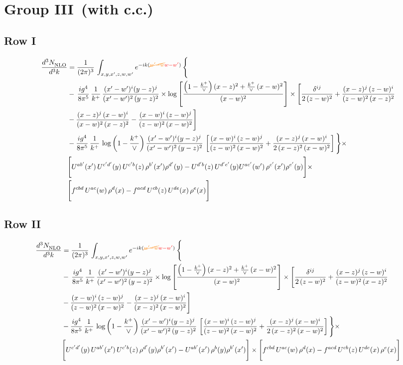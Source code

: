 \documentclass[9pt]{article}
\numberwithin{equation}{section}
\begin{document}
\section{Group III\, (with c.c.)}
\subsection{Row I}
\begin{align}
     \frac{d^{3}N_{\rm NLO}^{\rm}}{d^{3}k}  & =   \frac{1}{(2\pi)^{3}}\, \int_{x,y,x',z,w,w^{\prime}} e^{-ik({\color{orange}\cancel{w^{\prime}-w}}{\color{red}w-w^{\prime}})}\, \Bigg\{\notag \\
& -\,\frac{ig^{4}}{8\pi^{5}}\,\frac{1}{k^{+}}\,\frac{(x'-w')^{i}(y-z)^{j}}{(x'-w')^{2}\,(y-z)^{2}}\times \log{\left[\frac{\left(1-\frac{k^{+}}{\vee}\right)(x-z)^{2}+\frac{k^{+}}{\vee}\,(x-w)^{2}}{(x-w)^{2}}\right]}\times \Bigg[\frac{\delta^{ij}}{2\,(z-w)^{2}}+\frac{(x-z)^{j}\,(z-w)^{i}}{(z-w)^{2}\,(x-z)^{2}}\notag \\ & -\frac{(x-z)^{j}\,(x-w)^{i}}{(x-w)^{2}\,(x-z)^{2}}-\frac{(x-w)^{i}\,(z-w)^{j}}{(z-w)^{2}\,(x-w)^{2}}\Bigg] \notag \\
& -\frac{ig^{4}}{8\pi^{5}}\,\frac{1}{k^{+}}\,\log{\left(1-\frac{k^{+}}{\vee}\right)}\,\frac{(x'-w')^{i}(y-z)^{j}}{(x'-w')^{2}\,(y-z)^{2}}\,\left[\frac{(x-w)^{i}\,(z-w)^{j}}{(z-w)^{2}\,(x-w)^{2}}+\frac{(x-z)^{j}\,(x-w)^{i}}{2\,(x-z)^{2}\, (x-w)^{2}}\right]\Bigg\}\times \notag \\ &  \Bigg[U^{ab'}(x')\,U^{c'd'}(y)\,U^{c'b}(z)\,\rho^{b'}(x')\rho^{d'}(y)-U^{d'b}(z)\,U^{d'e'}(y)U^{ac'}(w')\,\rho^{c'}(x')\rho^{e'}(y)\Bigg]\times\notag \\ & \Bigg[f^{cbd}\,U^{ac}(w)\,\rho^{d}(x)-f^{acd}\, U^{cb}(z)\,U^{de}(x)\,\rho^{e}(x)\Bigg]
\end{align}
\subsection{Row II}
\begin{align}
     \frac{d^{3}N_{\rm NLO}^{\rm}}{d^{3}k}  & =   \frac{1}{(2\pi)^{3}}\, \int_{x,y,x',z,w,w^{\prime}} e^{-ik({\color{orange}\cancel{w^{\prime}-w}}{\color{red}w-w^{\prime}})}\, \Bigg\{\notag \\
& -\,\frac{ig^{4}}{8\pi^{5}}\,\frac{1}{k^{+}}\,\frac{(x'-w')^{i}(y-z)^{j}}{(x'-w')^{2}\,(y-z)^{2}}\times \log{\left[\frac{\left(1-\frac{k^{+}}{\vee}\right)(x-z)^{2}+\frac{k^{+}}{\vee}\,(x-w)^{2}}{(x-w)^{2}}\right]}\times \Bigg[\frac{\delta^{ij}}{2\,(z-w)^{2}}+\frac{(x-z)^{j}\,(z-w)^{i}}{(z-w)^{2}\,(x-z)^{2}}\notag \\ & -\frac{(x-w)^{i}\,(z-w)^{j}}{(z-w)^{2}\,(x-w)^{2}}-\frac{(x-z)^{j}\,(x-w)^{i}}{(x-z)^{2}\,(x-w)^{2}}\Bigg] \notag \\
& -\frac{ig^{4}}{8\pi^{5}}\,\frac{1}{k^{+}}\,\log{\left(1-\frac{k^{+}}{\vee}\right)}\,\frac{(x'-w')^{i}(y-z)^{j}}{(x'-w')^{2}\,(y-z)^{2}}\,\left[\frac{(x-w)^{i}\,(z-w)^{j}}{(z-w)^{2}\,(x-w)^{2}}+\frac{(x-z)^{j}\,(x-w)^{i}}{2\,(x-z)^{2}\, (x-w)^{2}}\right]\Bigg\}\times \notag \\ & \Bigg[U^{c'd'}(y)\,U^{ab'}(x')\,U^{c'b}(z)\,\rho^{d'}(y)\rho^{b'}(x')-U^{ab'}(x')\,\rho^{b}(y)\rho^{b'}(x')\Bigg]\times\Bigg[f^{cbd}\,U^{ac}(w)\,\rho^{d}(x)-f^{acd}\, U^{cb}(z)\,U^{de}(x)\,\rho^{e}(x)\Bigg]
\end{align}
\end{document}
